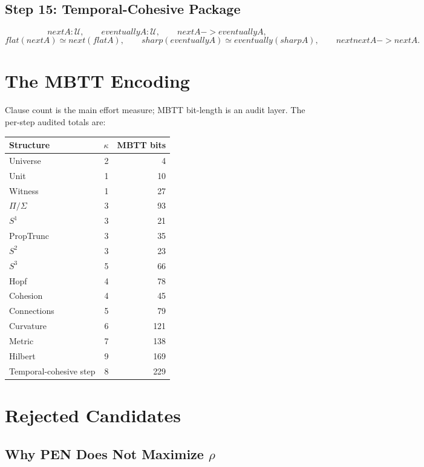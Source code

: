 \documentclass[11pt,a4paper]{article}
\def\to{->}%
\def\flat{flat}%
\def\sharp{sharp}%
\def\bigcirc{next}%
\def\Diamond{eventually}%
\theoremstyle{plain}
\theoremstyle{definition}
\theoremstyle{remark}
\newcommand{\U}{\mathcal{U}}
\begin{document}
\subsection{Step 15: Temporal-Cohesive Package}

\[
  \bigcirc A:\U,
  \qquad
  \Diamond A:\U,
  \qquad
  \bigcirc A\to \Diamond A,
\]
\[
  \flat(\bigcirc A)\simeq \bigcirc(\flat A),
  \qquad
  \sharp(\Diamond A)\simeq \Diamond(\sharp A),
  \qquad
  \bigcirc\bigcirc A\to \bigcirc A.
\]

\section{The MBTT Encoding}
\label{app:mbtt}

Clause count is the main effort measure; MBTT bit-length is an audit layer.  The per-step audited totals are:

\begin{center}
\small
\begin{tabular}{@{}lrr@{}}
\toprule
Structure & $\kappa$ & MBTT bits \\
\midrule
Universe & 2 & 4 \\
Unit & 1 & 10 \\
Witness & 1 & 27 \\
$\Pi/\Sigma$ & 3 & 93 \\
$S^1$ & 3 & 21 \\
PropTrunc & 3 & 35 \\
$S^2$ & 3 & 23 \\
$S^3$ & 5 & 66 \\
Hopf & 4 & 78 \\
Cohesion & 4 & 45 \\
Connections & 5 & 79 \\
Curvature & 6 & 121 \\
Metric & 7 & 138 \\
Hilbert & 9 & 169 \\
Temporal-cohesive step & 8 & 229 \\
\bottomrule
\end{tabular}
\end{center}

\section{Rejected Candidates}
\label{app:rejected}

\subsection{Why PEN Does Not Maximize \texorpdfstring{$\rho$}{rho}}
\end{document}
